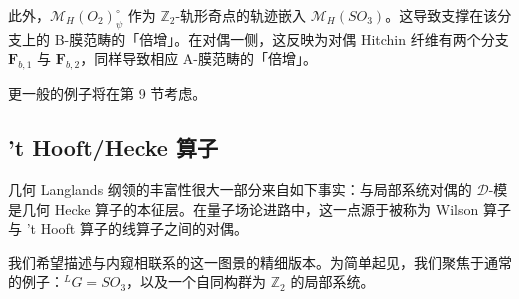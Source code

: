 \documentclass[11pt,a4paper]{article}
\begin{document}


此外，$\mathcal{M}_H(O_2)_\psi^\circ$ 作为 $\mathbb{Z}_2$-轨形奇点的轨迹嵌入 $\mathcal{M}_H(SO_3)$。这导致支撑在该分支上的 B-膜范畴的「倍增」。在对偶一侧，这反映为对偶 Hitchin 纤维有两个分支 $\boldsymbol{F}_{b,1}$ 与 $\boldsymbol{F}_{b,2}$，同样导致相应 A-膜范畴的「倍增」。

更一般的例子将在第 9 节考虑。



\subsection{'t Hooft/Hecke 算子}

几何 Langlands 纲领的丰富性很大一部分来自如下事实：与局部系统对偶的 $\mathcal{D}$-模是几何 Hecke 算子的本征层。在量子场论进路中，这一点源于被称为 Wilson 算子与 't Hooft 算子的线算子之间的对偶。

我们希望描述与内窥相联系的这一图景的精细版本。为简单起见，我们聚焦于通常的例子：${}^{L}G=SO_3$，以及一个自同构群为 $\mathbb{Z}_2$ 的局部系统。

\end{document}
